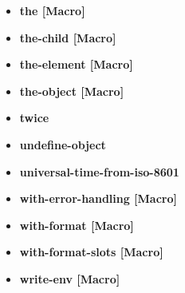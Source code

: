 \documentclass [11pt]{book}
\begin{document}
\begin{itemize}
\item {}
\label{prim:the}
\textbf{the [Macro]}





\item {}
\label{prim:the-child}
\textbf{the-child [Macro]}





\item {}
\label{prim:the-element}
\textbf{the-element [Macro]}





\item {}
\label{prim:the-object}
\textbf{the-object [Macro]}





\item {}
\label{prim:twice}
\textbf{twice}





\item {}
\label{prim:undefine-object}
\textbf{undefine-object}





\item {}
\label{prim:universal-time-from-iso-8601}
\textbf{universal-time-from-iso-8601}





\item {}
\label{prim:with-error-handling}
\textbf{with-error-handling [Macro]}





\item {}
\label{prim:with-format}
\textbf{with-format [Macro]}





\item {}
\label{prim:with-format-slots}
\textbf{with-format-slots [Macro]}





\item {}
\label{prim:write-env}
\textbf{write-env [Macro]}






\end{itemize}
\end{document}
